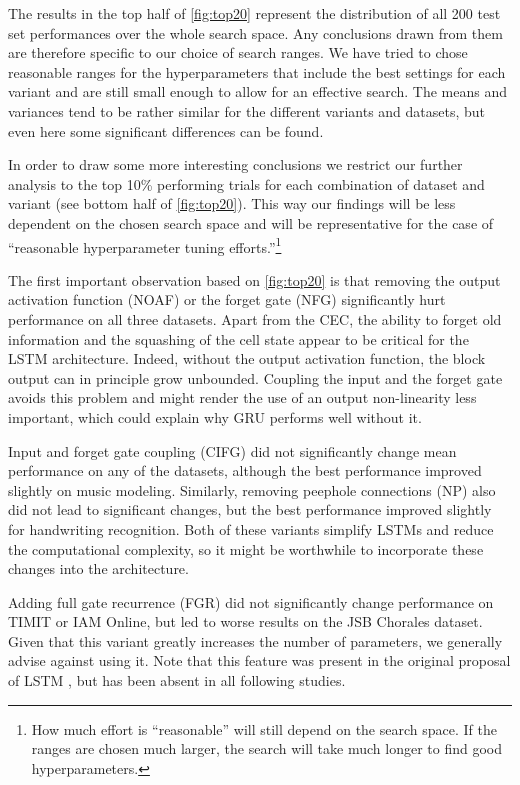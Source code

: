 The results in the top half of \autoref{fig:top20} represent the distribution of all 200 test set performances over the whole search space. Any conclusions drawn from them are therefore specific to our choice of search ranges. We have tried to chose reasonable ranges for the hyperparameters that include the best settings for each variant and are still small enough to allow for an effective search. The means and variances tend to be rather similar for the different variants and datasets, but even here some significant differences can be found. 

In order to draw some more interesting conclusions we restrict our further analysis to the top 10\% performing trials for each combination of dataset and variant (see bottom half of \autoref{fig:top20}). 
This way our findings will be less dependent on the chosen search space and will be representative for the case of ``reasonable hyperparameter tuning efforts.''\footnote{How much effort is ``reasonable'' will still depend on the search space. If the ranges are chosen much larger, the search will take much longer to find good hyperparameters.}

The first important observation based on \autoref{fig:top20} is that removing the output activation function (NOAF) or the forget gate (NFG) significantly hurt performance on all three datasets. Apart from the CEC, the ability to forget old information and the squashing of the cell state appear to be critical for the LSTM architecture. Indeed, without the output activation function, the block output can in principle grow unbounded. Coupling the input and the forget gate avoids this problem and might render the use of an output non-linearity less important, which could explain why GRU performs well without it.

Input and forget gate coupling (CIFG) did not significantly change mean performance on any of the datasets, although the best performance improved slightly on music modeling. Similarly, removing peephole connections (NP) also did not lead to significant changes, but the best performance improved slightly for handwriting recognition. Both of these variants simplify LSTMs and reduce the computational complexity, so it might be worthwhile to incorporate these changes into the architecture.

Adding full gate recurrence (FGR) did not significantly change performance on TIMIT or IAM Online, but led to worse results on the JSB Chorales dataset. Given that this variant greatly increases the number of parameters, we generally advise against using it. Note that this feature was present in the original proposal of LSTM \cite{Hochreiter1995, Hochreiter1997}, but has been absent in all following studies.

